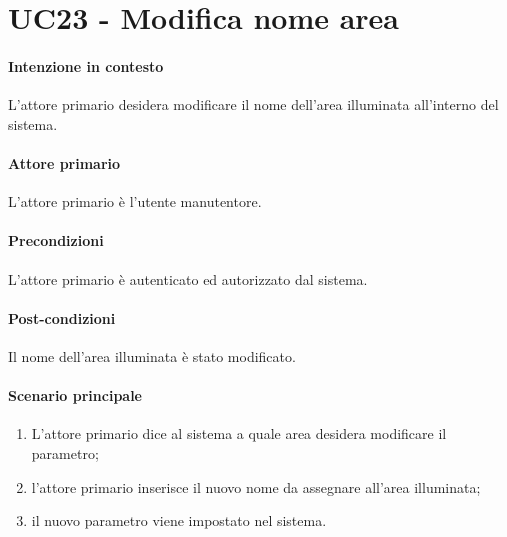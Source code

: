 \section{UC23 - Modifica nome area}\label{uc:23}
\paragraph{Intenzione in contesto} L'attore primario desidera modificare il nome dell'area illuminata all'interno del sistema.
\paragraph{Attore primario} L'attore primario è l'utente manutentore.
\paragraph{Precondizioni}  L'attore primario è autenticato ed autorizzato dal sistema.
\paragraph{Post-condizioni} Il nome dell'area illuminata è stato modificato.
\paragraph{Scenario principale}
\begin{enumerate}
    \item L'attore primario dice al sistema a quale area desidera modificare il parametro;
    \item l'attore primario inserisce il nuovo nome da assegnare all'area illuminata;
    \item il nuovo parametro viene impostato nel sistema.
\end{enumerate}